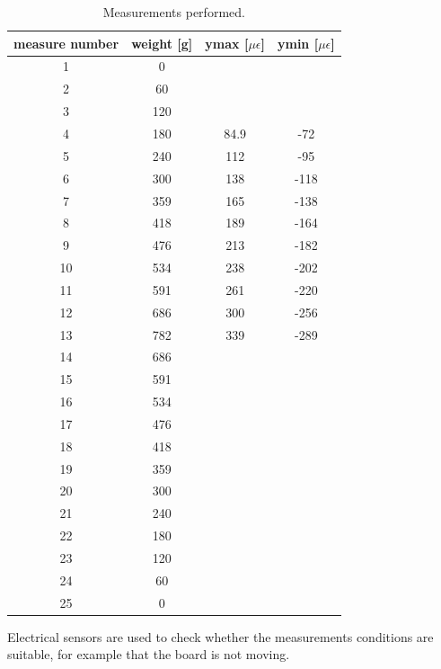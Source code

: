 \begin{table}[H]
  \centering
  \begin{tabular}{c|c|c|c}
      measure number & weight [g] & ymax [$\mu \epsilon$] & ymin [$\mu \epsilon$]\\
			\hline
      1 & 0 &  &  \\
      2 & 60 &  &  \\
      3 & 120 &  &  \\
      4 & 180 & 84.9 & -72 \\
      5 & 240 & 112 & -95 \\
      6 & 300 & 138 & -118 \\
      7 & 359 & 165 & -138 \\
      8 & 418 & 189 & -164 \\
      9 & 476 & 213 & -182 \\
      10 & 534 & 238 & -202 \\
      11 & 591 & 261 & -220 \\
      12 & 686 & 300 & -256 \\
      13 & 782 & 339 & -289 \\
      14 & 686 &  &  \\
      15 & 591 &  &  \\
      16 & 534 &  &  \\
      17 & 476 &  &  \\
      18 & 418 &  &  \\
      19 & 359 &  &  \\
      20 & 300 &  &  \\
      21 & 240 &  &  \\
      22 & 180 &  &  \\
      23 & 120 &  &  \\
      24 & 60 &  &  \\
      25 & 0 &  &  \\
  \end{tabular}
  \caption{Measurements performed.}
  \label{table:measures}
\end{table}
Electrical sensors are used to check whether the measurements conditions are suitable, for example that the board is not moving.




